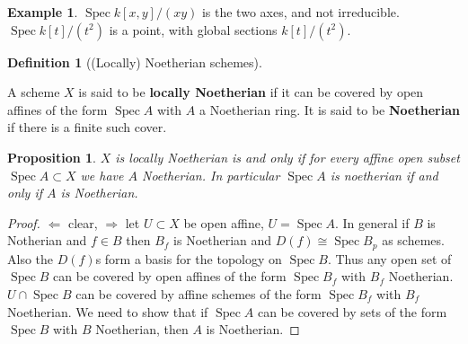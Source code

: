 \documentclass[10pt,]{book}
\newcommand{\terminology}[1]{\textbf{#1}}
\theoremstyle{plain}
\newtheorem{proposition}[theorem]{Proposition}
\theoremstyle{definition}
\newtheorem{definition}[theorem]{Definition}
\newtheorem{example}[theorem]{Example}
\numberwithin{equation}{section}
\DeclareMathOperator{\Spec}{Spec}
\begin{document}
\begin{example}\label{example-3}
\(\Spec k[x,y]/(xy)\) is the two axes, and not irreducible.\newline{}\(\Spec k[t]/(t^2)\) is a point, with global sections \(k[t]/(t^2)\).\newline{}\end{example}
\begin{definition}[(Locally) Noetherian schemes]\label{definition-9}

            A scheme \(X\) is said to be \terminology{locally Noetherian} if it can be covered by open affines of the form \(\Spec A\) with \(A\) a Noetherian ring.
            It is said to be \terminology{Noetherian} if there is a finite such cover.
          \end{definition}
\begin{proposition}\label{proposition-4}
\(X\) is locally Noetherian is and only if for every affine open subset \(\Spec A \subset X\) we have \(A\) Noetherian.
            In particular \(\Spec A\) is noetherian if and only if \(A\) is Noetherian.
          \end{proposition}
\begin{proof}
\(\Leftarrow\) clear, \(\Rightarrow\) let \(U \subset X\) be open affine, \(U = \Spec A\).
            In general if \(B\) is Notherian and \(f \in B\) then \(B_f\) is Noetherian and \(D(f) \cong \Spec B_p\) as schemes.
            Also the \(D(f)\)s form a basis for the topology on \(\Spec B\).
            Thus any open set of \(\Spec B\) can be covered by open affines of the form \(\Spec B_f \) with \(B_f\) Noetherian.
            \(U \cap \Spec B\) can be covered by affine schemes of the form \(\Spec B_f\) with \(B_f \) Noetherian.
            We need to show that if \(\Spec A\) can be covered by sets of the form \(\Spec B\) with \(B\) Noetherian, then \(A\) is Noetherian.
          \end{proof}
%
\backmatter
%
\end{document}
